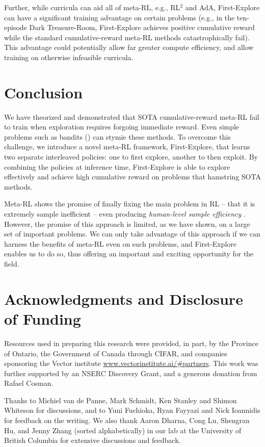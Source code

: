 \documentclass{article}
\begin{document}
Further, while curricula can aid all of meta-RL, e.g., RL\(^2\) and AdA, First-Explore can have a significant training advantage on certain problems (e.g., in the ten-episode Dark Treasure-Room, First-Explore achieves positive cumulative reward while the standard cumulative-reward meta-RL methods catastrophically fail). This advantage could potentially allow far greater compute efficiency, and allow training on otherwise infeasible curricula.

\section{Conclusion}

We have theorized and demonstrated that SOTA cumulative-reward meta-RL fail to train when exploration requires forgoing immediate reward. Even simple problems such as bandits () can stymie these methods. To overcome this challenge, we introduce a novel meta-RL framework, First-Explore, that learns two separate interleaved policies: one to first explore, another to then exploit. By combining the policies at inference time, First-Explore is able to explore effectively and achieve high cumulative reward on problems that hamstring SOTA methods.

Meta-RL shows the promise of finally fixing the main problem in RL -- that it is extremely sample inefficient -- even producing \emph{human-level sample efficiency} \citep{adaptiveagentteam2023humantimescale}. However, the promise of this approach is limited, as we have shown, on a large set of important problems. We can only take advantage of this approach if we can harness the benefits of meta-RL even on such problems, and First-Explore enables us to do so, thus offering an important  and exciting opportunity for the field. 

\pagebreak

\section*{Acknowledgments and Disclosure of Funding}

Resources used in preparing this research were provided, in part, by the Province of Ontario, the Government of Canada through CIFAR, and companies sponsoring the Vector institute \url{www.vectorinstitute.ai/\#partners}. This work was further supported by an NSERC Discovery Grant, and a generous donation from Rafael Cosman.

Thanks to Michiel van de Panne, Mark Schmidt, Ken Stanley and Shimon Whiteson for discussions, and to Yuni Fuchioka, Ryan Fayyazi and Nick Ioannidis for feedback on the writing. We also thank Aaron Dharna, Cong Lu, Shengran Hu, and Jenny Zhang (sorted alphabetically) in our lab at the University of British Columbia for extensive discussions and feedback.
\end{document}
